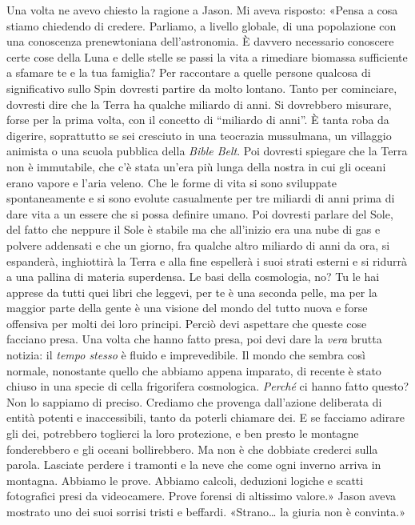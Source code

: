 Una volta ne avevo chiesto la ragione a Jason. Mi aveva risposto: «Pensa
a cosa stiamo chiedendo di credere. Parliamo, a livello globale, di una
popolazione con una conoscenza prenewtoniana dell'astronomia. È davvero
necessario conoscere certe cose della Luna e delle stelle se passi la
vita a rimediare biomassa sufficiente a sfamare te e la tua famiglia?
Per raccontare a quelle persone qualcosa di significativo sullo Spin
dovresti partire da molto lontano. Tanto per cominciare, dovresti dire
che la Terra ha qualche miliardo di anni. Si dovrebbero misurare, forse
per la prima volta, con il concetto di ``miliardo di anni''. È tanta
roba da digerire, soprattutto se sei cresciuto in una teocrazia
mussulmana, un villaggio animista o una scuola pubblica della
\emph{Bible Belt}. Poi dovresti spiegare che la Terra non è immutabile,
che c'è stata un'era più lunga della nostra in cui gli oceani erano
vapore e l'aria veleno. Che le forme di vita si sono sviluppate
spontaneamente e si sono evolute casualmente per tre miliardi di anni
prima di dare vita a un essere che si possa definire umano. Poi dovresti
parlare del Sole, del fatto che neppure il Sole è stabile ma che
all'inizio era una nube di gas e polvere addensati e che un giorno, fra
qualche altro miliardo di anni da ora, si espanderà, inghiottirà la
Terra e alla fine espellerà i suoi strati esterni e si ridurrà a una
pallina di materia superdensa. Le basi della cosmologia, no? Tu le hai
apprese da tutti quei libri che leggevi, per te è una seconda pelle, ma
per la maggior parte della gente è una visione del mondo del tutto nuova
e forse offensiva per molti dei loro principi. Perciò devi aspettare che
queste cose facciano presa. Una volta che hanno fatto presa, poi devi
dare la \emph{vera} brutta notizia: il \emph{tempo stesso} è fluido e
imprevedibile. Il mondo che sembra così normale, nonostante quello che
abbiamo appena imparato, di recente è stato chiuso in una specie di
cella frigorifera cosmologica. \emph{Perché} ci hanno fatto questo? Non
lo sappiamo di preciso. Crediamo che provenga dall'azione deliberata di
entità potenti e inaccessibili, tanto da poterli chiamare dei. E se
facciamo adirare gli dei, potrebbero toglierci la loro protezione, e ben
presto le montagne fonderebbero e gli oceani bollirebbero. Ma non è che
dobbiate crederci sulla parola. Lasciate perdere i tramonti e la neve
che come ogni inverno arriva in montagna. Abbiamo le prove. Abbiamo
calcoli, deduzioni logiche e scatti fotografici presi da videocamere.
Prove forensi di altissimo valore.» Jason aveva mostrato uno dei suoi
sorrisi tristi e beffardi. «Strano\ldots{} la giuria non è convinta.»

